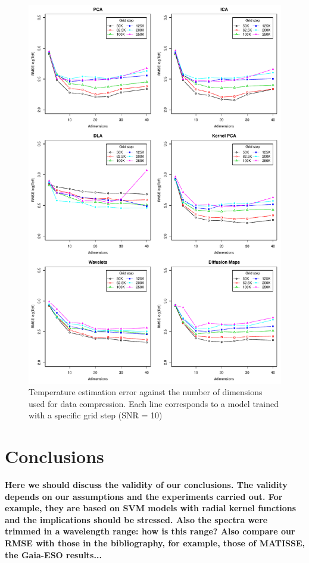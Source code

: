 \documentclass[a4paper,fleqn,usenatbib]{mnras}
\begin{document}
{{{\begin{figure}
\centering\includegraphics[height=0.95\textheight]{bestSVM_Teff_N-RMSE_HR10_snr=10_all.pdf}
\caption{Temperature estimation error against the number of dimensions
  used for data compression. Each line corresponds to a model trained
  with a specific grid step (SNR = 10)}
\label{fig:grid10}
\end{figure}


\section{Conclusions}
\label{sec:conclusions}

{\bf Here we should discuss the validity of our conclusions. The
  validity depends on our assumptions and the experiments carried
  out. For example, they are based on SVM models with radial kernel
  functions and the implications should be stressed. Also the spectra
  were trimmed in a wavelength range: how is this range? Also compare
  our RMSE with those in the bibliography, for example, those of
  MATISSE, the Gaia-ESO results...}

}}}
\end{document}
